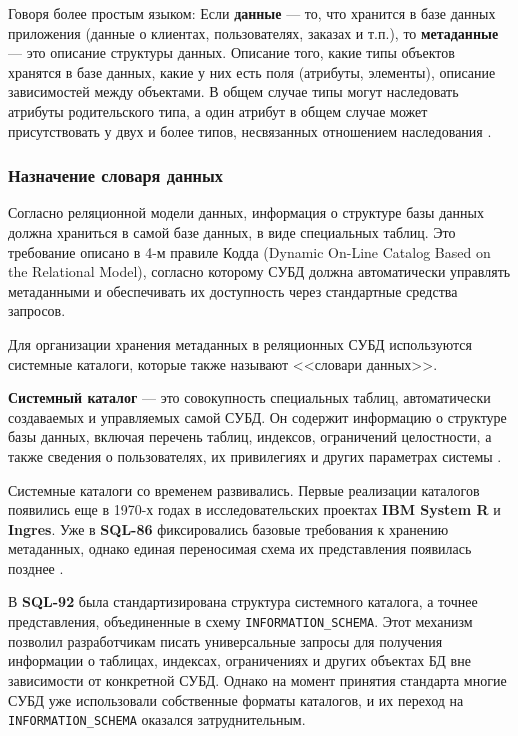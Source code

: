 Говоря более простым языком: 
Если \textbf{данные} — то, что хранится в базе данных приложения (данные о клиентах, пользователях, заказах и т.п.), то \textbf{метаданные} — это описание структуры данных. Описание того, какие типы объектов хранятся в базе данных, какие у них есть поля (атрибуты, элементы), описание зависимостей между объектами. В общем случае типы могут наследовать атрибуты родительского типа, а один атрибут в общем случае может присутствовать у двух и более типов, несвязанных отношением наследования \autocite{Metadatahabr}.

\subsubsection{Назначение словаря данных}

Согласно реляционной модели данных, информация о структуре базы данных должна храниться в самой базе данных, в виде специальных таблиц. Это требование описано в 4-м правиле Кодда (Dynamic On-Line Catalog Based on the Relational Model), согласно которому СУБД должна автоматически управлять метаданными и обеспечивать их доступность через стандартные средства запросов.

Для организации хранения метаданных в реляционных СУБД используются системные каталоги, которые также называют <<словари данных>>.

\begin{grayquote}
    \textbf{Системный каталог} — это совокупность специальных таблиц, автоматически создаваемых и управляемых самой СУБД. Он содержит информацию о структуре базы данных, включая перечень таблиц, индексов, ограничений целостности, а также сведения о пользователях, их привилегиях и других параметрах системы \autocite{IntuitLec14}.
\end{grayquote}

Системные каталоги со временем развивались. Первые реализации каталогов появились еще в 1970-х годах в исследовательских проектах \textbf{IBM System R} и \textbf{Ingres}. Уже в \textbf{SQL-86} фиксировались базовые требования к хранению метаданных, однако единая переносимая схема их представления появилась позднее \autocite{DictHist}.

В \textbf{SQL-92} была стандартизирована структура системного каталога, а точнее представления, объединенные в схему \texttt{INFORMATION\_SCHEMA}. Этот механизм позволил разработчикам писать универсальные запросы для получения информации о таблицах, индексах, ограничениях и других объектах БД вне зависимости от конкретной СУБД. Однако на момент принятия стандарта многие СУБД уже использовали собственные форматы каталогов, и их переход на \texttt{INFORMATION\_SCHEMA} оказался затруднительным.

